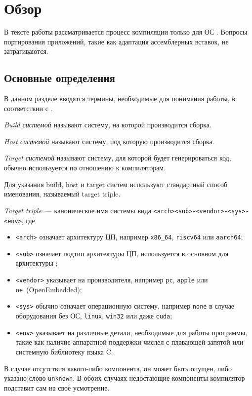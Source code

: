 
\section{Обзор}
\label{sec:relatedworks}

В тексте работы рассматривается процесс компиляции только для ОС \linux{}.
Вопросы портирования приложений, такие как адаптация ассемблерных вставок, не затрагиваются.

\subsection{Основные определения}
\label{subsec:defs}

В данном разделе вводятся термины, необходимые для понимания работы, в соответствии с \cite{mackenzieCreatingAutomaticConfiguration2021, WelcomeClangDocumentation}.
\begin{definition}[Build]
	\textit{Build системой} называют систему, на которой производится сборка.
\end{definition}
\begin{definition}[Host]
	\textit{Host системой} называют систему, под которую производится сборка.
\end{definition}
\begin{definition}[Target]
	\textit{Target системой} называют систему, для которой будет генерироваться код, обычно используется по отношению к компиляторам.
\end{definition}

Для указания build, host и target систем используют стандартный способ именования, называемый target triple.

\begin{definition}
	\textit{Target triple}~--- каноническое имя системы вида \texttt{<arch><sub>-<vendor>-<sys>-<env>}, где
	\begin{itemize}
		\item \texttt{<arch>} означает архитектуру ЦП, например \texttt{x86\_64}, \texttt{riscv64} или \texttt{aarch64};
		\item \texttt{<sub>} означает подтип архитектуры ЦП, используется в основном для архитектуры \arm{};
		\item \texttt{<vendor>} указывает на производителя, например \texttt{pc}, \texttt{apple} или \texttt{oe}~(OpenEmbedded);
		\item \texttt{<sys>} обычно означает операционную систему, например \texttt{none} в случае оборудования без ОС, \texttt{linux}, \texttt{win32} или даже \texttt{cuda};
		\item \texttt{<env>} указывает на различные детали, необходимые для работы программы, такие как наличие аппаратной поддержки числел с плавающей запятой или системную библиотеку языка \textsc{C}.
	\end{itemize}
	В случае отсутствия какого-либо компонента, он может быть опущен, либо указано слово \texttt{unknown}.
	В обоих случаях недостающие компоненты компилятор подставит сам на своё усмотрение.
\end{definition}

